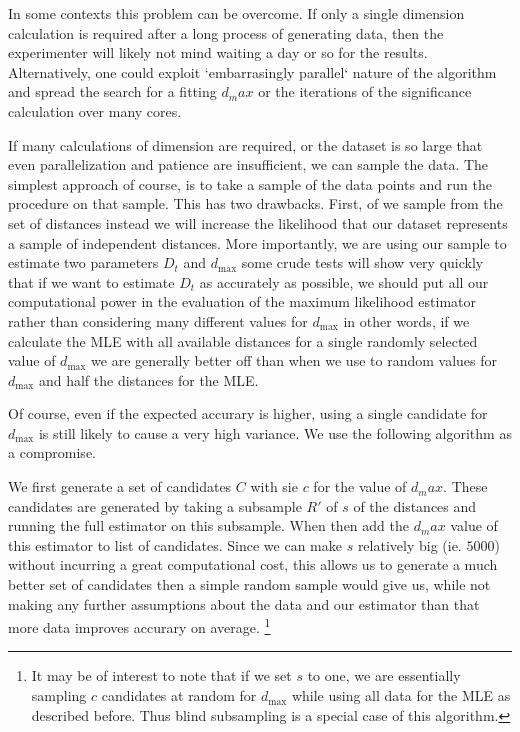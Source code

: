 \documentclass[11pt]{article}
\begin{document}
In some contexts this problem can be overcome. If only a single dimension calculation is required after a long process of generating data, then the experimenter will likely not mind waiting a day or so for the results. Alternatively, one could exploit `embarrasingly parallel` nature of the algorithm and spread the search for a fitting $d_max$ or the iterations of the significance calculation over many cores.

If many calculations of dimension are required, or the dataset is so large that even parallelization and patience are insufficient, we can sample the data. The simplest approach of course, is to take a sample of the data points and run the procedure on that sample. This has two drawbacks. First, of we sample from the set of distances instead we will increase the likelihood that our dataset represents a sample of independent distances. More importantly, we are using our sample to estimate two parameters $D_t$ and $d_{\max}$ some crude tests will show very quickly that if we want to estimate $D_t$ as accurately as possible, we should put all our computational power in the evaluation of the maximum likelihood estimator rather than considering many different values for $d_{\max}$ in other words, if we calculate the MLE with all available distances for a single randomly selected value of $d_{\max}$ we are generally better off than when we use to random values for $d_{\max}$ and half the distances for the MLE. 

Of course, even if the expected accurary is higher, using a single candidate for $d_{\max}$ is still likely to cause a very high variance. We use the following algorithm as a compromise.

We first generate a set of candidates $C$ with sie $c$ for the value of $d_max$. These candidates are generated by taking a subsample $R'$ of $s$ of the distances and running the full estimator on this subsample. When then add the $d_max$ value of this estimator to list of candidates. Since we can make $s$ relatively big (ie. $5000$) without incurring a great computational cost, this allows us to generate a much better set of candidates then a simple random sample would give us, while not making any further assumptions about the data and our estimator than that more data improves accurary on average. \footnote{It may be of interest to note that if we set $s$ to one, we are essentially sampling $c$ candidates at random for $d_{\max}$ while using all data for the MLE as described before. Thus blind subsampling is a special case of this algorithm.}
\end{document}

